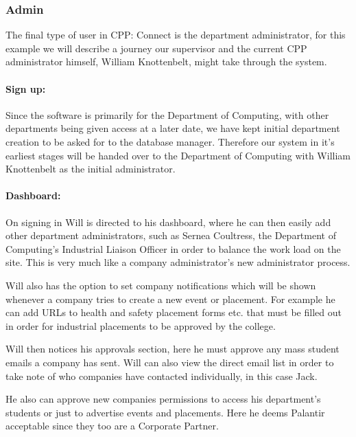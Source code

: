 \subsubsection{Admin}
  The final type of user in CPP: Connect is the department administrator, for this example we will describe a journey our supervisor and the current CPP administrator himself, William Knottenbelt, might take through the system.
  \paragraph{Sign up:}
    Since the software is primarily for the Department of Computing, with other departments being given access at a later date, we have kept initial department creation to be asked for to the database manager. 
    Therefore our system in it's earliest stages will be handed over to the Department of Computing with William Knottenbelt as the initial administrator.

  \paragraph{Dashboard:}
    On signing in Will is directed to his dashboard, where he can then easily add other department administrators, such as Sernea Coultress, the Department of Computing's Industrial Liaison Officer in order to balance the work load on the site. This is very much like a company administrator's new administrator process.


    Will also has the option to set company notifications which will be shown whenever a company tries to create a new event or placement. For example he can add URLs to health and safety placement forms etc. that must be filled out in order for industrial placements to be approved by the college. 

    Will then notices his approvals section, here he must approve any mass student emails a company has sent. Will can also view the direct email list in order to take note of who companies have contacted individually, in this case Jack.

    He also can approve new companies permissions to access his department's students or just to advertise events and placements. Here he deems Palantir acceptable since they too are a Corporate Partner.


